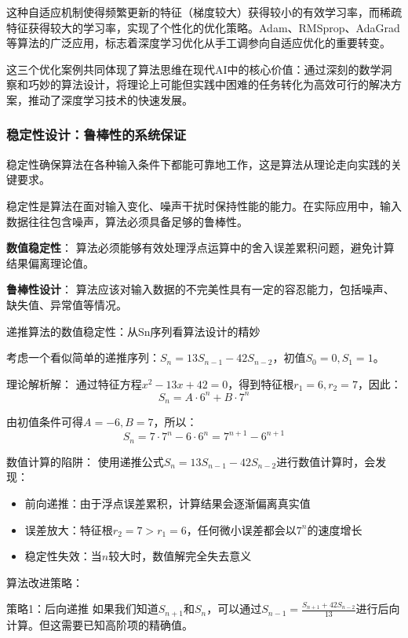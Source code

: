 这种自适应机制使得频繁更新的特征（梯度较大）获得较小的有效学习率，而稀疏特征获得较大的学习率，实现了个性化的优化策略。Adam、RMSprop、AdaGrad等算法的广泛应用，标志着深度学习优化从手工调参向自适应优化的重要转变。

这三个优化案例共同体现了算法思维在现代AI中的核心价值：通过深刻的数学洞察和巧妙的算法设计，将理论上可能但实践中困难的任务转化为高效可行的解决方案，推动了深度学习技术的快速发展。

\subsubsection{稳定性设计：鲁棒性的系统保证}

稳定性确保算法在各种输入条件下都能可靠地工作，这是算法从理论走向实践的关键要求。

稳定性是算法在面对输入变化、噪声干扰时保持性能的能力。在实际应用中，输入数据往往包含噪声，算法必须具备足够的鲁棒性。

\textbf{数值稳定性}：
算法必须能够有效处理浮点运算中的舍入误差累积问题，避免计算结果偏离理论值。

\textbf{鲁棒性设计}：
算法应该对输入数据的不完美性具有一定的容忍能力，包括噪声、缺失值、异常值等情况。

递推算法的数值稳定性：从Sn序列看算法设计的精妙

考虑一个看似简单的递推序列：$S_n = 13S_{n-1} - 42S_{n-2}$，初值$S_0 = 0, S_1 = 1$。

理论解析解：
通过特征方程$x^2 - 13x + 42 = 0$，得到特征根$r_1 = 6, r_2 = 7$，因此：
$$S_n = A \cdot 6^n + B \cdot 7^n$$

由初值条件可得$A = -6, B = 7$，所以：
$$S_n = 7 \cdot 7^n - 6 \cdot 6^n = 7^{n+1} - 6^{n+1}$$

数值计算的陷阱：
使用递推公式$S_n = 13S_{n-1} - 42S_{n-2}$进行数值计算时，会发现：

\begin{itemize}
\item 前向递推：由于浮点误差累积，计算结果会逐渐偏离真实值
\item 误差放大：特征根$r_2 = 7 > r_1 = 6$，任何微小误差都会以$7^n$的速度增长
\item 稳定性失效：当$n$较大时，数值解完全失去意义
\end{itemize}

算法改进策略：

策略1：后向递推
如果我们知道$S_{n+1}$和$S_n$，可以通过$S_{n-1} = \frac{S_{n+1} + 42S_{n-2}}{13}$进行后向计算。但这需要已知高阶项的精确值。


